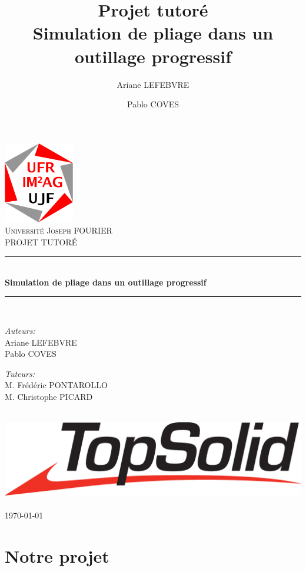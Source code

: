 \documentclass[a4paper, 11pt]{article}
\title{Projet tutoré\\Simulation de pliage dans un outillage progressif}
\author{Ariane LEFEBVRE \and Pablo COVES}
\date{}
\newcommand{\HRule}{\rule{\linewidth}{0.5mm}}
\begin{document}
\begin{titlepage}
    \begin{center}
        \includegraphics[width=0.23\textwidth]{img/imag.eps}~\\[1cm]
        \textsc{\LARGE Université Joseph FOURIER}\\[1.5cm]
        \textsc{\Large PROJET TUTORÉ}\\[0.5cm]
        \HRule \\[0.4cm]
        { \huge \bfseries Simulation de pliage dans un outillage progressif}\\[0.4cm]
        \HRule \\[1.5cm]
        \begin{minipage}{0.4\textwidth}
            \begin{flushleft} \large
                \emph{Auteurs:}\\
                Ariane LEFEBVRE\\
                Pablo COVES
            \end{flushleft}
        \end{minipage}
        \begin{minipage}{0.5\textwidth}
            \begin{flushright} \large
                \emph{Tuteurs:} \\
                M. Frédéric PONTAROLLO\\
                M. Christophe PICARD
            \end{flushright}
        \end{minipage}\\[2cm]
        \includegraphics[width=.5\textwidth]{img/topSolid.eps}~\\[1cm]
        \vfill
        {\large \today}
    \end{center}
\end{titlepage}
\newpage
\tableofcontents
\newpage
\section{Notre projet}
\end{document}
